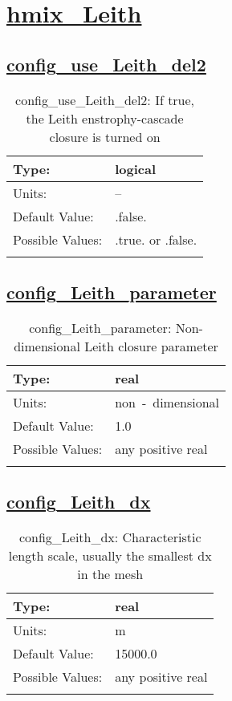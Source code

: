 \section[hmix\_Leith]{\hyperref[sec:nm_tab_hmix_Leith]{hmix\_Leith}}
\label{sec:nm_sec_hmix_Leith}
\subsection[config\_use\_Leith\_del2]{\hyperref[sec:nm_tab_hmix_Leith]{config\_use\_Leith\_del2}}
\label{subsec:nm_sec_config_use_Leith_del2}
\begin{center}
\begin{longtable}{| p{2.0in} || p{4.0in} |}
    \hline
    Type: & logical \\
    \hline
    Units: & -- \\
    \hline
    Default Value: & .false. \\
    \hline
    Possible Values: & .true. or .false. \\
    \hline
    \caption{config\_use\_Leith\_del2: If true, the Leith enstrophy-cascade closure is turned on}
\end{longtable}
\end{center}
\subsection[config\_Leith\_parameter]{\hyperref[sec:nm_tab_hmix_Leith]{config\_Leith\_parameter}}
\label{subsec:nm_sec_config_Leith_parameter}
\begin{center}
\begin{longtable}{| p{2.0in} || p{4.0in} |}
    \hline
    Type: & real \\
    \hline
    Units: & \si{non-dimensional} \\
    \hline
    Default Value: & 1.0 \\
    \hline
    Possible Values: & any positive real \\
    \hline
    \caption{config\_Leith\_parameter: Non-dimensional Leith closure parameter}
\end{longtable}
\end{center}
\subsection[config\_Leith\_dx]{\hyperref[sec:nm_tab_hmix_Leith]{config\_Leith\_dx}}
\label{subsec:nm_sec_config_Leith_dx}
\begin{center}
\begin{longtable}{| p{2.0in} || p{4.0in} |}
    \hline
    Type: & real \\
    \hline
    Units: & \si{m} \\
    \hline
    Default Value: & 15000.0 \\
    \hline
    Possible Values: & any positive real \\
    \hline
    \caption{config\_Leith\_dx: Characteristic length scale, usually the smallest dx in the mesh}
\end{longtable}
\end{center}
